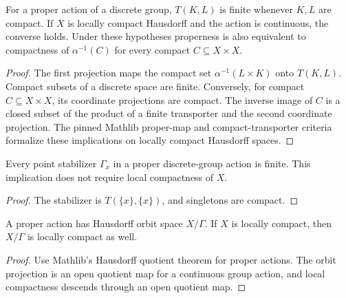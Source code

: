 \begin{proposition}\label{prop:compact-transporter-criterion}
For a proper action of a discrete group, $T(K,L)$ is finite whenever
$K,L$ are compact. If $X$ is locally compact Hausdorff and the action is
continuous, the converse holds. Under these hypotheses properness is also
equivalent to compactness of $\alpha^{-1}(C)$ for every compact
$C\subseteq X\times X$.
\end{proposition}
\begin{proof}
\leanok
The first projection maps the compact set $\alpha^{-1}(L\times K)$
onto $T(K,L)$. Compact subsets of a discrete space are finite.
Conversely, for compact $C\subseteq X\times X$, its coordinate projections
are compact. The inverse image of $C$ is a closed subset of the product
of a finite transporter and the second coordinate projection.
The pinned Mathlib proper-map and compact-transporter criteria formalize
these implications on locally compact Hausdorff spaces.
\end{proof}

\begin{proposition}\label{prop:proper-finite-stabilizers}
Every point stabilizer $\Gamma_x$ in a proper discrete-group action is
finite. This implication does not require local compactness of $X$.
\end{proposition}
\begin{proof}
\leanok
The stabilizer is $T(\{x\},\{x\})$, and singletons are compact.
\end{proof}

\begin{proposition}\label{prop:proper-orbit-space}
A proper action has Hausdorff orbit space $X/\Gamma$. If $X$ is locally
compact, then $X/\Gamma$ is locally compact as well.
\end{proposition}
\begin{proof}
\leanok
Use Mathlib's Hausdorff quotient theorem for proper actions. The orbit
projection is an open quotient map for a continuous group action, and
local compactness descends through an open quotient map.
\end{proof}

